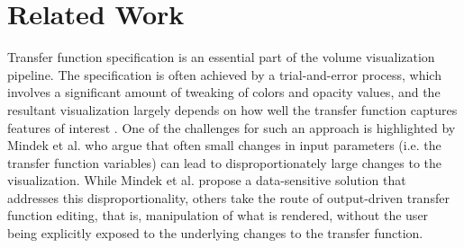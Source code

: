 \documentclass[twoside,twocolumn,10pt]{article}
\begin{document}

\section{Related Work}


Transfer function specification is an essential part of the volume visualization pipeline.
The specification is often achieved by a trial-and-error process, which involves a significant amount of tweaking of colors and opacity values, and the resultant visualization largely depends on how well the transfer function captures features of interest \cite{kniss_multidimensional_2002} \cite{kindlmann_curvature-based_2003}.%
One of the challenges for such an approach is highlighted by Mindek et al. \cite{mindek_data-sensitive_2017} who argue that often small changes in input parameters (i.e. the transfer function variables) can lead to disproportionately large changes to the visualization. While Mindek et al. propose a data-sensitive solution that addresses this disproportionality, others take the route of output-driven transfer function editing, that is, manipulation of what is rendered, without the user being explicitly exposed to the underlying changes to the transfer function.


\end{document}
